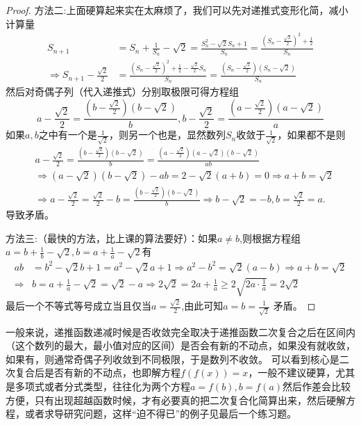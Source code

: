 \documentclass[lang=cn,newtx,10pt,scheme=chinese]{elegantbook}
\begin{document}
\begin{proof}
{\color{blue}方法二:}上面硬算起来实在太麻烦了，我们可以先对递推式变形化简，减小计算量
\begin{align*}
S_{n + 1}&=S_n+\frac{1}{S_n}-\sqrt{2}=\frac{S_n^2-\sqrt{2}S_n + 1}{S_n}=\frac{\left(S_n-\frac{\sqrt{2}}{2}\right)^2+\frac{1}{2}}{S_n}\\
\Rightarrow S_{n + 1}-\frac{\sqrt{2}}{2}&=\frac{\left(S_n-\frac{\sqrt{2}}{2}\right)^2+\frac{1}{2}-\frac{\sqrt{2}}{2}S_n}{S_n}=\frac{\left(S_n-\frac{\sqrt{2}}{2}\right)(S_n-\sqrt{2})}{S_n}
\end{align*}
然后对奇偶子列（代入递推式）分别取极限可得方程组
\[a-\frac{\sqrt{2}}{2}=\frac{\left(b-\frac{\sqrt{2}}{2}\right)(b - \sqrt{2})}{b},b-\frac{\sqrt{2}}{2}=\frac{\left(a-\frac{\sqrt{2}}{2}\right)(a - \sqrt{2})}{a}\]
如果\(a,b\)之中有一个是\(\frac{1}{\sqrt{2}}\)，则另一个也是，显然数列\(S_n\)收敛于\(\frac{1}{\sqrt{2}}\)，如果都不是则
\begin{align*}
&a-\frac{\sqrt{2}}{2}=\frac{\left( b-\frac{\sqrt{2}}{2} \right) (b-\sqrt{2})}{b}=\frac{\left( a-\frac{\sqrt{2}}{2} \right) (a-\sqrt{2})(b-\sqrt{2})}{ab}
\\
&\Rightarrow \left( a-\sqrt{2} \right) \left( b-\sqrt{2} \right) -ab=2-\sqrt{2}(a+b)=0\Rightarrow a+b=\sqrt{2}
\\
&\Rightarrow a-\frac{\sqrt{2}}{2}=\frac{\sqrt{2}}{2}-b=\frac{\left( b-\frac{\sqrt{2}}{2} \right) (b-\sqrt{2})}{b}\Rightarrow b-\sqrt{2}=-b,b=\frac{\sqrt{2}}{2}=a.
\end{align*}
导致矛盾。

{\color{blue}方法三:}（最快的方法，比上课的算法要好）：如果\(a\neq b\),则根据方程组\(a = b+\frac{1}{b}-\sqrt{2},b = a+\frac{1}{a}-\sqrt{2}\)有
\begin{align*}
ab&=b^2-\sqrt{2}b+1=a^2-\sqrt{2}a+1\Rightarrow a^2-b^2=\sqrt{2}\left( a-b \right) \Rightarrow a+b=\sqrt{2}\\
\Rightarrow &b=a+\frac{1}{a}-\sqrt{2}=\sqrt{2}-a\Rightarrow 2\sqrt{2}=2a+\frac{1}{a}\geq2\sqrt{2a\cdot\frac{1}{a}}=2\sqrt{2}
\end{align*}
最后一个不等式等号成立当且仅当$a=\frac{\sqrt{2}}{2}$,由此可知\(a = b=\frac{1}{\sqrt{2}}\) 矛盾。
\end{proof}
\begin{remark}
一般来说，递推函数递减时候是否收敛完全取决于递推函数二次复合之后在区间内（这个数列的最大，最小值对应的区间）是否会有新的不动点，如果没有就收敛，如果有，则通常奇偶子列收敛到不同极限，于是数列不收敛。
可以看到核心是二次复合后是否有新的不动点，也即解方程\(f(f(x)) = x\)，一般不建议硬算，尤其是多项式或者分式类型，往往化为两个方程\(a = f(b),b = f(a)\)然后作差会比较方便，只有出现超越函数时候，才有必要真的把二次复合化简算出来，然后硬解方程，或者求导研究问题，这样“迫不得已”的例子见最后一个练习题。
\end{remark}
\end{document}
